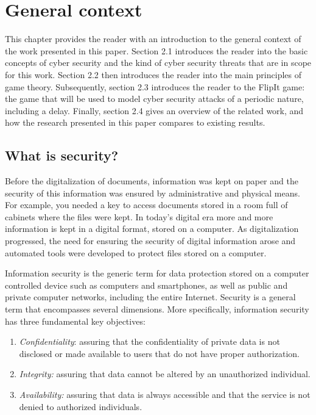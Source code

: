 \chapter{General context}
\label{Chapter1:Intro.Game.Theory}
%


This chapter provides the reader with an introduction to the general context of the work presented in this paper.  Section 2.1 introduces the reader into the basic concepts of cyber security and the kind of cyber security threats that are in scope for this work. Section 2.2 then introduces the reader into the main principles of game theory. Subsequently, section 2.3 introduces the reader to the FlipIt game: the game that will be used to model cyber security attacks of a periodic nature, including a delay.  Finally, section 2.4 gives an overview of the related work, and how the research presented in this paper compares to existing results.

\section{What is security?}

Before the digitalization of documents, information was kept on paper and the security of this information was ensured by administrative and physical means. For example, you needed a key to access documents stored in a room full of cabinets where the files were kept. In today's digital era more and more information is kept in a digital format, stored on a computer.  As digitalization progressed, the need for ensuring the security of digital information arose and automated tools were developed to protect files stored on a computer.  

Information security is the generic term for data protection stored on a computer controlled device such as computers and smartphones, as well as public and private computer networks, including the entire Internet. 
Security is a general term that encompasses several dimensions. More specifically, information security has three fundamental key objectives:

\begin{enumerate}
\item  \textit{Confidentiality}: assuring that the confidentiality of private data is not disclosed or made available to users that do not have proper authorization.
\item \textit{Integrity:} assuring that data cannot be altered by an unauthorized individual.
\item \textit{Availability:} assuring that data is always accessible and that the service is not denied to authorized individuals.
\end{enumerate}



